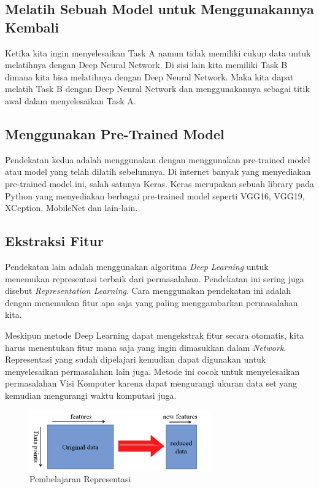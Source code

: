 \subsection{Melatih Sebuah Model untuk Menggunakannya Kembali}
\par Ketika kita ingin menyelesaikan Task A namun tidak memiliki cukup data untuk melatihnya dengan Deep Neural Network. Di sisi lain kita memiliki Task B dimana kita bisa melatihnya dengan Deep Neural Network. Maka kita dapat melatih Task B dengan Deep Neural Network dan menggunakannya sebagai titik awal dalam menyelesaikan Task A.

\subsection{Menggunakan Pre-Trained Model}
\par Pendekatan kedua adalah menggunakan dengan menggunakan pre-trained model atau model yang telah dilatih sebelumnya. Di internet banyak yang menyediakan pre-trained model ini, salah satunya Keras. Keras merupakan sebuah library pada Python yang menyediakan berbagai pre-trained model seperti VGG16, VGG19, XCeption, MobileNet dan lain-lain. 

\subsection{Ekstraksi Fitur}
\par Pendekatan lain adalah menggunakan algoritma \textit{Deep Learning} untuk menemukan representasi terbaik dari permasalahan. Pendekatan ini sering juga disebut \textit{Representation Learning}.  Cara menggunakan pendekatan ini adalah dengan menemukan fitur apa saja yang paling menggambarkan permasalahan kita. 
\par Meskipun metode Deep Learning dapat mengekstrak fitur secara otomatis, kita harus menentukan fitur mana saja yang ingin dimasukkan dalam \textit{Network}. Representasi yang sudah dipelajari kemudian dapat digunakan untuk menyelesaikan permasalahan lain juga. Metode ini cocok untuk menyelesaikan permasalahan Visi Komputer karena dapat mengurangi ukuran data set yang kemudian mengurangi waktu komputasi juga.

\begin{figure}[ht]
	\centering\includegraphics[width=0.7\textwidth]{bab2/figures/rep_features.png}
	\caption{Pembelajaran Representasi\cite{transfer_how}}
	\label{fig:rep-works}
\end{figure}

